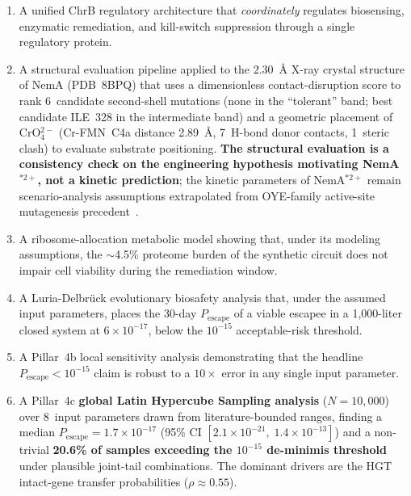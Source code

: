 \documentclass[10pt,twocolumn,letterpaper,
              colorlinks=true,
              linkcolor=blue!70!black,
              citecolor=blue!70!black,
              urlcolor=blue!70!black,
              pdfborder={0 0 0}]{article}
\begin{document}
\begin{enumerate}
  \item A unified ChrB regulatory architecture that
        \textit{coordinately} regulates biosensing, enzymatic
        remediation, and kill-switch suppression through a single
        regulatory protein.

  \item A structural evaluation pipeline applied to the 2.30~\AA{}
        X-ray crystal structure of NemA (PDB~8BPQ) that uses a
        dimensionless contact-disruption score to rank 6~candidate
        second-shell mutations (none in the ``tolerant'' band; best
        candidate ILE~328 in the intermediate band) and a geometric
        placement of CrO$_4^{2-}$ (Cr-FMN~C4a distance 2.89~\AA{},
        7~H-bond donor contacts, 1~steric clash) to evaluate substrate
        positioning. \textbf{The structural evaluation is a consistency
        check on the engineering hypothesis motivating NemA$^{*2+}$,
        not a kinetic prediction}; the kinetic parameters of
        NemA$^{*2+}$ remain scenario-analysis assumptions extrapolated
        from OYE-family active-site mutagenesis
        precedent~\cite{mowafy2010}.

  \item A ribosome-allocation metabolic model showing that, under its
        modeling assumptions, the $\sim$4.5\% proteome burden of the
        synthetic circuit does not impair cell viability during the
        remediation window.

  \item A Luria-Delbr\"{u}ck evolutionary biosafety analysis that,
        under the assumed input parameters, places the 30-day
        $P_{\text{escape}}$ of a viable escapee in a 1{,}000-liter
        closed system at $6 \times 10^{-17}$, below the $10^{-15}$
        acceptable-risk threshold.

  \item A Pillar~4b local sensitivity analysis demonstrating that the
        headline $P_{\text{escape}} < 10^{-15}$ claim is robust to a
        $10\times$ error in any single input parameter.

  \item A Pillar~4c \textbf{global Latin Hypercube Sampling analysis}
        ($N = 10{,}000$) over 8~input parameters drawn from
        literature-bounded ranges, finding a median
        $P_{\text{escape}} = 1.7 \times 10^{-17}$ (95\% CI
        $[2.1 \times 10^{-21},\; 1.4 \times 10^{-13}]$) and a
        non-trivial \textbf{20.6\% of samples exceeding the $10^{-15}$
        de-minimis threshold} under plausible joint-tail combinations.
        The dominant drivers are the HGT intact-gene transfer
        probabilities ($\rho \approx 0.55$).
\end{enumerate}
\end{document}
